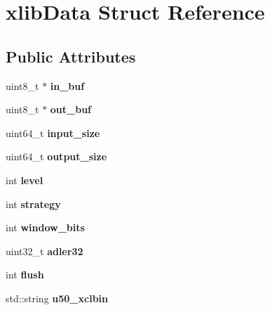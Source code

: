 \hypertarget{structxlibData}{\section{xlib\-Data Struct Reference}
\label{structxlibData}
}
\subsection*{Public Attributes}
\begin{DoxyCompactItemize}
\item 
\hypertarget{structxlibData_aae3bf4ee1c43a225f30608342c055a48}{uint8\-\_\-t $\ast$ {\bfseries in\-\_\-buf}}\label{structxlibData_aae3bf4ee1c43a225f30608342c055a48}

\item 
\hypertarget{structxlibData_ab4e50cde44c135a807b7f9b12ea62ac8}{uint8\-\_\-t $\ast$ {\bfseries out\-\_\-buf}}\label{structxlibData_ab4e50cde44c135a807b7f9b12ea62ac8}

\item 
\hypertarget{structxlibData_a7a176e85c1843a722fa47cb82d759b07}{uint64\-\_\-t {\bfseries input\-\_\-size}}\label{structxlibData_a7a176e85c1843a722fa47cb82d759b07}

\item 
\hypertarget{structxlibData_ad4e9193559fc872f3ed148ddb3b32062}{uint64\-\_\-t {\bfseries output\-\_\-size}}\label{structxlibData_ad4e9193559fc872f3ed148ddb3b32062}

\item 
\hypertarget{structxlibData_ae9403a54b065162b97a38588e85bc32f}{int {\bfseries level}}\label{structxlibData_ae9403a54b065162b97a38588e85bc32f}

\item 
\hypertarget{structxlibData_a80237a47cdb64fe118a8b6eb34c45e07}{int {\bfseries strategy}}\label{structxlibData_a80237a47cdb64fe118a8b6eb34c45e07}

\item 
\hypertarget{structxlibData_a822c511d79a90b76ac605299260e7ded}{int {\bfseries window\-\_\-bits}}\label{structxlibData_a822c511d79a90b76ac605299260e7ded}

\item 
\hypertarget{structxlibData_a60f13588ad585222601a2bcac3380ab0}{uint32\-\_\-t {\bfseries adler32}}\label{structxlibData_a60f13588ad585222601a2bcac3380ab0}

\item 
\hypertarget{structxlibData_a9c4814f8637fa6929fcc40f3632908d5}{int {\bfseries flush}}\label{structxlibData_a9c4814f8637fa6929fcc40f3632908d5}

\item 
\hypertarget{structxlibData_a357a9a7ecd00182a9aa6c9f1222221ba}{std\-::string {\bfseries u50\-\_\-xclbin}}\label{structxlibData_a357a9a7ecd00182a9aa6c9f1222221ba}

\end{DoxyCompactItemize}


